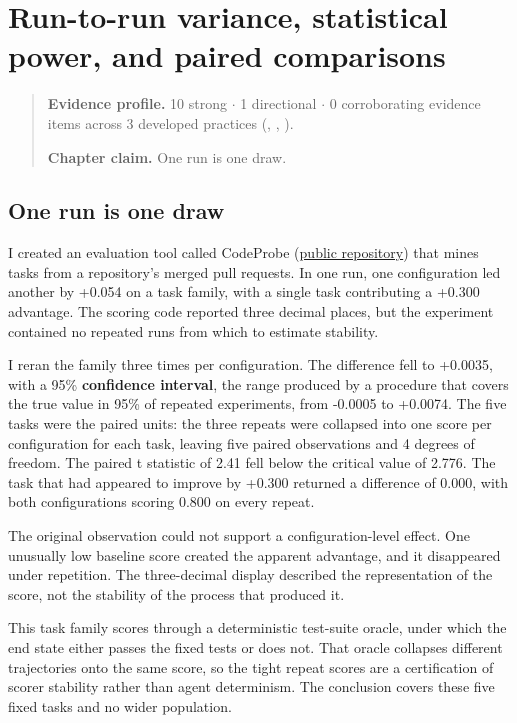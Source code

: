 \chapter{Run-to-run variance, statistical power, and paired comparisons}
\label{ch01-variance-power-paired-comparisons}
\begin{quote}
\textbf{Evidence profile.} 10 strong \(\cdot\) 1 directional \(\cdot\) 0 corroborating evidence items across 3 developed practices (, , ).

\textbf{Chapter claim.} One run is one draw.
\end{quote}

\hypertarget{one-run-is-one-draw}{%
\section{One run is one draw}\label{one-run-is-one-draw}}

I created an evaluation tool called CodeProbe (\href{https://github.com/sjarmak/codeprobe}{public repository}) that mines tasks from a repository's merged pull requests. In one run, one configuration led another by +0.054 on a task family, with a single task contributing a +0.300 advantage. The scoring code reported three decimal places, but the experiment contained no repeated runs from which to estimate stability.

I reran the family three times per configuration. The difference fell to +0.0035, with a 95\% \textbf{confidence interval}, the range produced by a procedure that covers the true value in 95\% of repeated experiments, from -0.0005 to +0.0074. The five tasks were the paired units: the three repeats were collapsed into one score per configuration for each task, leaving five paired observations and 4 degrees of freedom. The paired t statistic of 2.41 fell below the critical value of 2.776. The task that had appeared to improve by +0.300 returned a difference of 0.000, with both configurations scoring 0.800 on every repeat.

The original observation could not support a configuration-level effect. One unusually low baseline score created the apparent advantage, and it disappeared under repetition. The three-decimal display described the representation of the score, not the stability of the process that produced it.

This task family scores through a deterministic test-suite oracle, under which the end state either passes the fixed tests or does not. That oracle collapses different trajectories onto the same score, so the tight repeat scores are a certification of scorer stability rather than agent determinism. The conclusion covers these five fixed tasks and no wider population.

